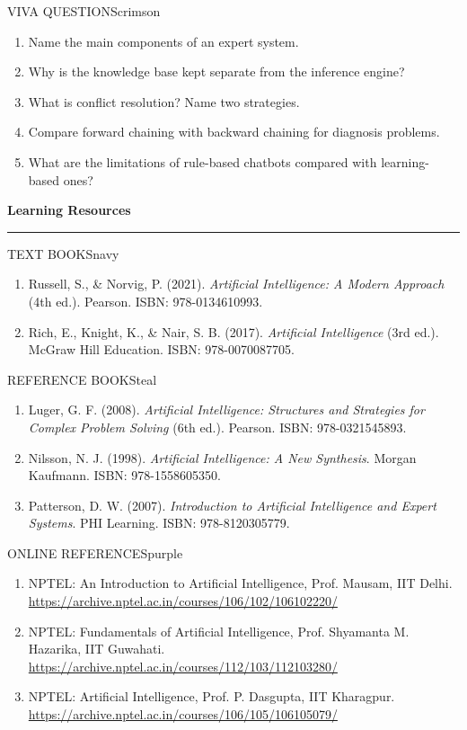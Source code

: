 \documentclass[11pt,a4paper]{article}
\newenvironment{viva}{\begin{secbox}{VIVA QUESTIONS}{crimson}}{\end{secbox}}
\begin{document}
\begin{viva}
\begin{enumerate}
  \item Name the main components of an expert system.
  \item Why is the knowledge base kept separate from the inference engine?
  \item What is conflict resolution? Name two strategies.
  \item Compare forward chaining with backward chaining for diagnosis problems.
  \item What are the limitations of rule-based chatbots compared with learning-based ones?
\end{enumerate}
\end{viva}

\clearpage
{}
{\sffamily\bfseries\Large\color{navy}Learning Resources}\par
{\color{gold}\rule{\textwidth}{1.2pt}}

\begin{secbox}{TEXT BOOKS}{navy}
\begin{enumerate}
  \item Russell, S., \& Norvig, P. (2021). \textit{Artificial Intelligence: A Modern Approach} (4th ed.). Pearson. ISBN: 978-0134610993.
  \item Rich, E., Knight, K., \& Nair, S. B. (2017). \textit{Artificial Intelligence} (3rd ed.). McGraw Hill Education. ISBN: 978-0070087705.
\end{enumerate}
\end{secbox}
\begin{secbox}{REFERENCE BOOKS}{teal}
\begin{enumerate}
  \item Luger, G. F. (2008). \textit{Artificial Intelligence: Structures and Strategies for Complex Problem Solving} (6th ed.). Pearson. ISBN: 978-0321545893.
  \item Nilsson, N. J. (1998). \textit{Artificial Intelligence: A New Synthesis}. Morgan Kaufmann. ISBN: 978-1558605350.
  \item Patterson, D. W. (2007). \textit{Introduction to Artificial Intelligence and Expert Systems}. PHI Learning. ISBN: 978-8120305779.
\end{enumerate}
\end{secbox}
\begin{secbox}{ONLINE REFERENCES}{purple}
\begin{enumerate}
  \item NPTEL: An Introduction to Artificial Intelligence, Prof. Mausam, IIT Delhi. \url{https://archive.nptel.ac.in/courses/106/102/106102220/}
  \item NPTEL: Fundamentals of Artificial Intelligence, Prof. Shyamanta M. Hazarika, IIT Guwahati. \url{https://archive.nptel.ac.in/courses/112/103/112103280/}
  \item NPTEL: Artificial Intelligence, Prof. P. Dasgupta, IIT Kharagpur. \url{https://archive.nptel.ac.in/courses/106/105/106105079/}
\end{enumerate}
\end{secbox}
\end{document}
